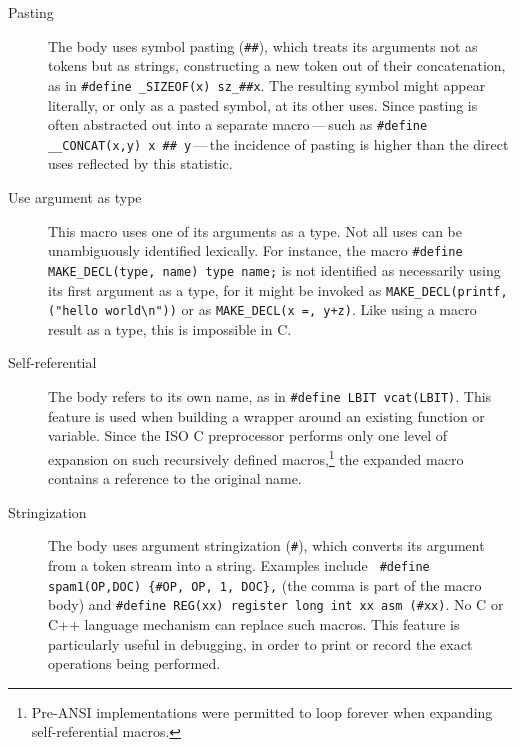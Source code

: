 \begin{description}
\item[Pasting]
  The body uses symbol pasting ({\tt \#\#}), which treats its arguments not
  as tokens but as strings, constructing a new token out of their
  concatenation, as in {\tt \#define \verb|_SIZEOF|(x) \verb|sz_|\#\#x}.
  The resulting symbol might appear literally, or only as a pasted symbol,
  at its other uses.  Since pasting is often abstracted out into a separate
  macro\,---\,such as {\tt \#define \verb|__CONCAT|(x,y) x \#\#
  y}\,---\,the incidence of pasting is higher than the direct uses
  reflected by this statistic.

\item[Use argument as type]
  This macro uses one of its arguments as a type.  Not all uses can be
  unambiguously identified lexically.  For instance, the macro 
  {\tt \#define \verb|MAKE_DECL|(type, name) type name;}
  is not identified as necessarily using its first argument as a type, for
  it might be invoked as {\tt \verb|MAKE_DECL|(printf, ("hello
  world\verb|\|n"))} or as {\tt \verb|MAKE_DECL|(x =, y+z)}.
  Like using a macro result
  as a type, this is impossible in C\@.

\item[Self-referential]
  The body refers to its own name, as in {\tt \#define LBIT vcat(LBIT)}.
  This feature is used when building a wrapper around an existing function
  or variable.  Since the ISO C preprocessor performs only one level of
  expansion on such recursively defined macros,\footnote{Pre-ANSI
    implementations were permitted to loop forever when expanding
    self-referential macros.} the expanded macro contains a reference to
  the original name.

\item[Stringization]
  The body uses argument stringization ({\tt \#}), which converts its
  argument from a token stream into a string.  Examples include {\tt
  \#define spam1(OP,DOC) \verb|{|\#OP, OP, 1, DOC\verb|}|,} (the comma is
part of the macro body) and {\tt \#define REG(xx) register long int xx asm
(\#xx)}.  No C or C++ language mechanism can replace such macros.  This
feature is particularly useful in debugging, in order to print or record
the exact operations being performed.

\end{description}



